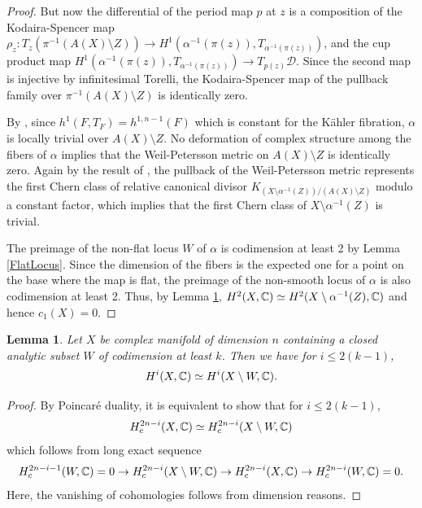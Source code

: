 \documentclass[a4, 12pt]{amsart}
\newtheorem{lem}[thm]{Lemma}
\numberwithin{equation}{section}
\theoremstyle{definition}
\begin{document}
\begin{proof}
But now the differential of the period map $p$ at $z$ is a composition of the Kodaira-Spencer map $\rho_z: T_z (\pi^{-1}(A(X) \setminus Z)) \to H^1(\alpha^{-1}(\pi(z)), T_{\alpha^{-1}(\pi(z))})$, and the cup product map $H^1(\alpha^{-1}(\pi(z)), T_{\alpha^{-1}(\pi(z))}) \to T_{p(z)}\mathcal{D}$. Since the second map is injective by infinitesimal Torelli,
the Kodaira-Spencer map of the pullback family over $\pi^{-1}(A(X) \setminus Z)$ is identically zero.

By \cite[Theorem 4.6]{Kod05}, since $h^1(F, T_F)=h^{1,n-1}(F)$ which is constant for the K\"ahler fibration, $\alpha$ is locally trivial over $A(X) \setminus Z$.
No deformation of complex structure among the fibers of $\alpha$ implies that the Weil-Petersson metric on $A(X) \setminus Z$ is identically zero.
Again by the result of \cite{BCS20}, the pullback of the Weil-Petersson metric represents the first Chern class of relative  canonical divisor $K_{(X \setminus \alpha^{-1}(Z))/(A(X) \setminus Z)}$ modulo a constant factor, which implies that the first Chern class of $X \setminus \alpha^{-1}(Z)$ is trivial.

The preimage of the non-flat locus $W$ of $\alpha$ is codimension at least 2 by Lemma \ref{FlatLocus}. Since the dimension of the fibers is the expected one for a point on the base where the map is flat, the preimage of the non-smooth locus of $\alpha$ is also codimension at least 2.
Thus, by Lemma \ref{Cohomology}, $H^2(X, \mathbb{C}) \simeq H^2(X \setminus \alpha^{-1}(Z), \mathbb{C} )$ and hence $c_1(X)=0$.
\end{proof}

\begin{lem}\label{Cohomology}
Let $X$ be complex manifold of dimension $n$ containing a closed analytic subset $W$ of codimension at least $k$.
Then we have for $i \leq 2(k-1)$,
$$ H^{i}(X, \mathbb{C}) \simeq H^{i}(X \setminus W,\mathbb{C}).$$
\end{lem}
\begin{proof}
By Poincar\'e duality, it is equivalent to show that for $i \leq 2(k-1)$,
$$ H^{2n-i}_c(X,\mathbb{C}) \simeq H^{2n-i}_c(X \setminus W,\mathbb{C})$$
which follows from long exact sequence
$$ H^{2n-i-1}_c(W,\mathbb{C})=0 \to H^{2n-i}_c(X \setminus W,\mathbb{C}) \to H^{2n-i}_c(X,\mathbb{C}) \to H^{2n-i}_c (W,\mathbb{C})=0.$$
Here, the vanishing of cohomologies follows from dimension reasons.
\end{proof}
\end{document}
